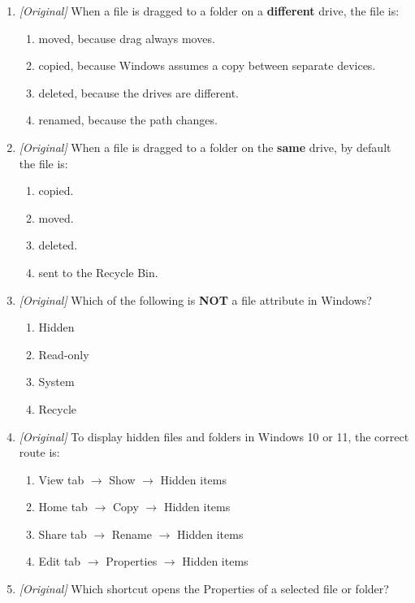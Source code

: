 \documentclass[11pt]{article}
\begin{document}
\begin{enumerate}[label=\textbf{Q\arabic*.}, leftmargin=*]
\begin{enumerate}[label=\Alph*.]
  \end{enumerate}
\item \textit{[Original]} When a file is dragged to a folder on a
  \textbf{different} drive, the file is:
  \begin{enumerate}[label=\Alph*.]
    \item moved, because drag always moves.
    \item copied, because Windows assumes a copy between separate devices.
    \item deleted, because the drives are different.
    \item renamed, because the path changes.
  \end{enumerate}
\item \textit{[Original]} When a file is dragged to a folder on the
  \textbf{same} drive, by default the file is:
  \begin{enumerate}[label=\Alph*.]
    \item copied.
    \item moved.
    \item deleted.
    \item sent to the Recycle Bin.
  \end{enumerate}
\item \textit{[Original]} Which of the following is \textbf{NOT} a file
  attribute in Windows?
  \begin{enumerate}[label=\Alph*.]
    \item Hidden
    \item Read-only
    \item System
    \item Recycle
  \end{enumerate}
\item \textit{[Original]} To display hidden files and folders in Windows 10 or
  11, the correct route is:
  \begin{enumerate}[label=\Alph*.]
    \item View tab $\rightarrow$ Show $\rightarrow$ Hidden items
    \item Home tab $\rightarrow$ Copy $\rightarrow$ Hidden items
    \item Share tab $\rightarrow$ Rename $\rightarrow$ Hidden items
    \item Edit tab $\rightarrow$ Properties $\rightarrow$ Hidden items
  \end{enumerate}
\item \textit{[Original]} Which shortcut opens the Properties of a selected
  file or folder?
  \begin{enumerate}[label=\Alph*.]

\end{enumerate}
\end{enumerate}
\end{document}
